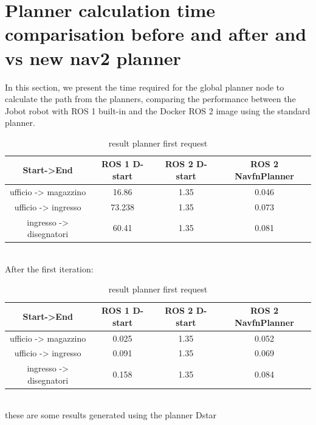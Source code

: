 \section{Planner calculation time comparisation before and after and vs new nav2 planner}
In this section, we present the time required for the global planner node to calculate the path from the planners, comparing the performance between the Jobot robot with ROS 1 built-in and the Docker ROS 2 image using the standard planner. \\
\begin{table}[h]
	\centering
	\begin{tabular}{|c|c|c|c|}
		\hline
		Start->End & ROS 1 D-start & ROS 2 D-start & ROS 2 NavfnPlanner \\
		\hline
		ufficio -> magazzino & 16.86 & 1.35 & 0.046 \\
		\hline
		ufficio -> ingresso & 73.238 & 1.35 & 0.073 \\
		\hline
		ingresso -> disegnatori & 60.41 & 1.35 & 0.081 \\
		\hline
	\end{tabular}
	\caption{result planner first request}
\end{table}\\
After the first iteration:
\begin{table}[h]
	\centering
	\begin{tabular}{|c|c|c|c|}
		\hline
		Start->End & ROS 1 D-start & ROS 2 D-start & ROS 2 NavfnPlanner \\
		\hline
		ufficio -> magazzino & 0.025 & 1.35 & 0.052 \\
		\hline
		ufficio -> ingresso & 0.091 & 1.35 & 0.069 \\
		\hline
		ingresso -> disegnatori & 0.158 & 1.35 & 0.084 \\
		\hline
	\end{tabular}
	\caption{result planner first request}
\end{table}\\

these are some results generated using the planner Dstar\\

